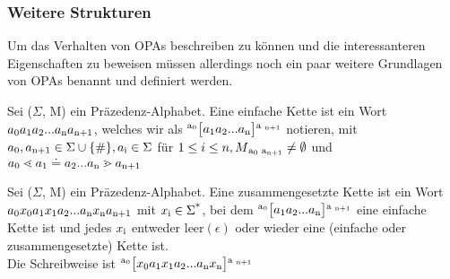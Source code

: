 \subsubsection*{Weitere Strukturen}
Um das Verhalten von OPAs beschreiben zu können und die interessanteren Eigenschaften zu beweisen müssen allerdings noch ein paar weitere Grundlagen von OPAs benannt und definiert werden.

\begin{definition}
Sei ($\Sigma$, M) ein Präzedenz-Alphabet. Eine einfache Kette ist ein Wort $a\textsubscript{0} a\textsubscript{1}a\textsubscript{2}...a\textsubscript{n}a\textsubscript{n+1}$, welches wir als $\textsuperscript{a\textsubscript{0}} \big[ a\textsubscript{1} a\textsubscript{2}... a\textsubscript{n} \big] \textsuperscript{a \textsubscript{n+1}}$ notieren,
mit $a\textsubscript{0}, a\textsubscript{n+1} \in \Sigma \cup \{ \# \}, a\textsubscript{i} \in \Sigma$ für $ 1 \leq i \leq n, M\textsubscript{a\textsubscript{0} a\textsubscript{n+1}} \neq \emptyset$ und $ a\textsubscript{0} \lessdot a\textsubscript{1} \doteq a\textsubscript{2}...a\textsubscript{n} \gtrdot a\textsubscript{n+1}$
\end{definition}

\begin{definition}
Sei ($\Sigma$, M) ein Präzedenz-Alphabet. Eine zusammengesetzte Kette ist ein Wort $a\textsubscript{0} x\textsubscript{0} a\textsubscript{1} x\textsubscript{1} a\textsubscript{2}...a\textsubscript{n}x\textsubscript{n} a\textsubscript{n+1}$ mit $x\textsubscript{i} \in \Sigma \textsuperscript{*}$, bei dem $\textsuperscript{a\textsubscript{0}} \big[ a\textsubscript{1} a\textsubscript{2}... a\textsubscript{n} \big] \textsuperscript{a \textsubscript{n+1}}$ eine einfache Kette ist und jedes $x\textsubscript{i}$ entweder leer$(\epsilon)$ oder wieder eine (einfache oder zusammengesetzte) Kette ist.\\
Die Schreibweise ist $\textsuperscript{a\textsubscript{0}} \big[x\textsubscript{0} a\textsubscript{1} x\textsubscript{1} a\textsubscript{2}... a\textsubscript{n} x\textsubscript{n} \big] \textsuperscript{a \textsubscript{n+1}}$
\end{definition}

